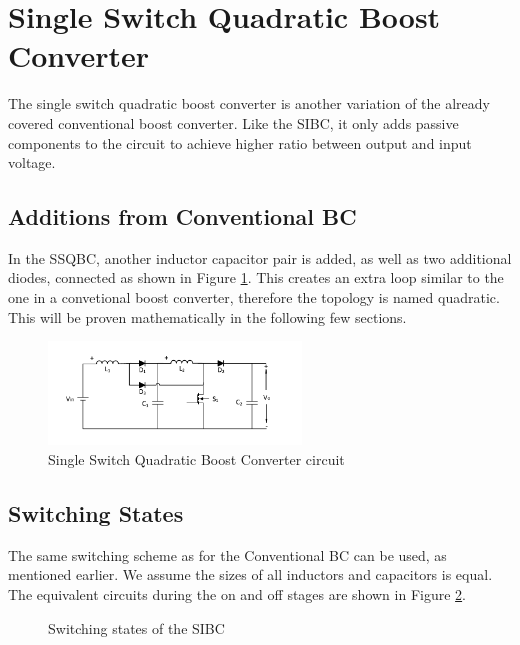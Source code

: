 \section{Single Switch Quadratic Boost Converter}\label{ch:SSQBC}

The single switch quadratic boost converter is another variation of the already covered conventional boost converter. Like the SIBC, it only adds passive components to the circuit to achieve higher ratio between output and input voltage. 

\subsection{Additions from Conventional BC}
In the SSQBC,
another inductor capacitor pair is added, as well as two additional diodes, connected as shown in Figure \ref{fig:SSQBC}. This creates an extra loop similar to the one in a convetional boost converter, therefore the topology is named quadratic. This will be proven mathematically in the following few sections.

\begin{figure} [H]
   \centering
   \includegraphics[width=0.6\textwidth]{figures/cSingleSwitchQuadraticBC/Quadratic_boost.pdf}
    \caption{Single Switch Quadratic Boost Converter circuit}
	\label{fig:SSQBC}
\end{figure}
\subsection{Switching States}
The same switching scheme as for the Conventional BC can be used,
as mentioned earlier. We assume the sizes of all inductors and capacitors is equal.
The equivalent circuits during the on and off stages are shown in Figure \ref{fig:SSQBC_States}.

\begin{figure}[H]%
    \centering
    \qquad
    \caption{Switching states of the SIBC}%
     \label{fig:SSQBC_States}%
\end{figure}

